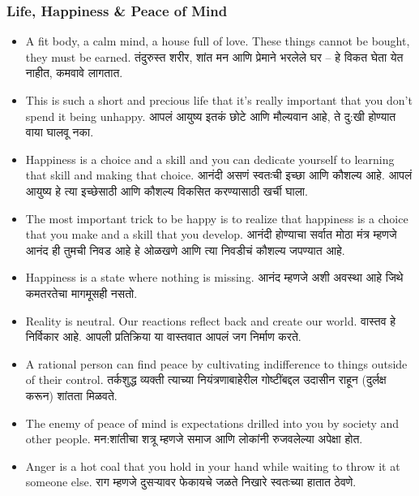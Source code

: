 \begin{frame}[fragile]\frametitle{Life, Happiness \& Peace of Mind}
\begin{itemize}
  \item A fit body, a calm mind, a house full of love. These things cannot be bought, they must be earned. तंदुरुस्त शरीर, शांत मन आणि प्रेमाने भरलेले घर – हे विकत घेता येत नाहीत, कमवावे लागतात.

  \item This is such a short and precious life that it’s really important that you don’t spend it being unhappy. आपलं आयुष्य इतकं छोटे आणि मौल्यवान आहे, ते दु:खी होण्यात वाया घालवू नका.

  \item Happiness is a choice and a skill and you can dedicate yourself to learning that skill and making that choice. आनंदी असणं स्वतःची इच्छा आणि कौशल्य आहे. आपलं आयुष्य हे त्या इच्छेसाठी आणि कौशल्य विकसित करण्यासाठी खर्ची घाला.

  \item The most important trick to be happy is to realize that happiness is a choice that you make and a skill that you develop. आनंदी होण्याचा सर्वात मोठा मंत्र म्हणजे आनंद ही तुमची निवड आहे हे ओळखणे आणि त्या निवडीचं कौशल्य जपण्यात आहे. 

  \item Happiness is a state where nothing is missing. आनंद म्हणजे अशी अवस्था आहे जिथे कमतरतेचा मागमूसही नसतो. 

  \item Reality is neutral. Our reactions reflect back and create our world. वास्तव हे निर्विकार आहे. आपली प्रतिक्रिया या वास्तवात आपलं जग निर्माण करते. 

  \item A rational person can find peace by cultivating indifference to things outside of their control. तर्कशुद्ध व्यक्ती त्याच्या नियंत्रणाबाहेरील गोष्टींबद्दल उदासीन राहून (दुर्लक्ष करून) शांतता मिळवते. 

  \item The enemy of peace of mind is expectations drilled into you by society and other people. मन:शांतीचा शत्रू म्हणजे समाज आणि लोकांनी रुजवलेल्या अपेक्षा होत. 

  \item Anger is a hot coal that you hold in your hand while waiting to throw it at someone else. राग म्हणजे दुसऱ्यावर फेकायचे जळते निखारे स्वतःच्या हातात ठेवणे.


\end{itemize}
\end{frame}
